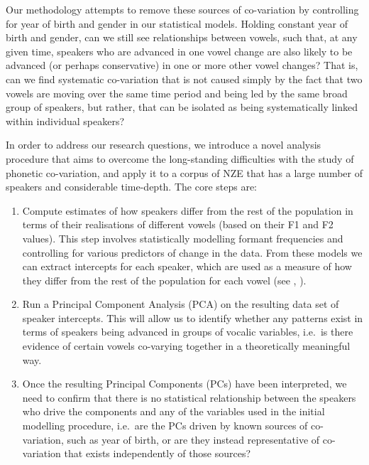 \documentclass[review]{elsarticle} %
\begin{document}
Our methodology attempts to remove these sources of co-variation by controlling for year of birth and gender in our statistical models.  Holding constant year of birth and gender, can we still see relationships between vowels, such that, at any given time, speakers who are advanced in one vowel change are also likely to be advanced (or perhaps conservative) in one or more other vowel changes?  That is, can we find systematic co-variation that is not caused simply by the fact that two vowels are moving over the same time period and being led by the same broad group of speakers, but rather, that can be isolated as being systematically linked within individual speakers?

In order to address our research questions, we introduce a novel analysis procedure that aims to overcome the long-standing difficulties with the study of phonetic co-variation, and apply it to a corpus of NZE that has a large number of speakers and considerable time-depth. The core steps are:

\begin{enumerate}
    \item Compute estimates of how  speakers differ from the rest of the population in terms of their realisations of different vowels (based on their F1 and F2 values). This step involves statistically modelling formant frequencies and controlling for various predictors of change in the data. From these models we can extract intercepts for each speaker, which are used as a measure of how they differ from the rest of the population for each vowel (see \citealt{drager2012exploiting}, \citealt{fruehwald2013phonological}).
    
    \item Run a Principal Component Analysis (PCA) on the resulting data set of speaker intercepts. This will allow us to identify whether any patterns exist in terms of speakers being advanced in groups of vocalic variables, i.e.\ is there evidence of certain vowels co-varying together in a theoretically meaningful way.
    
    \item Once the resulting Principal Components (PCs) have been interpreted, we need to confirm that there is no statistical relationship between the speakers who drive the components and any of the variables used in the initial modelling procedure, i.e.\ are the PCs driven by known sources of co-variation, such as year of birth, or are they instead representative of co-variation that exists independently of those sources?
    

\end{enumerate}
\end{document}
